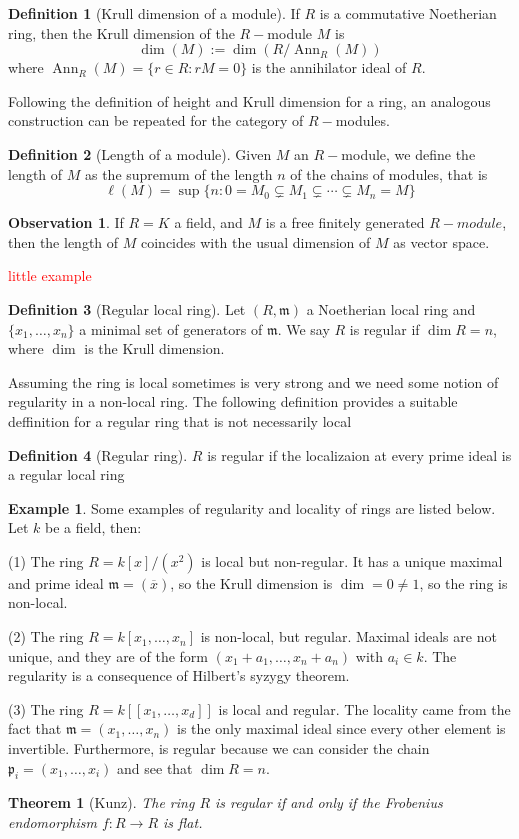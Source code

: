 \documentclass[leqno]{article}
\newtheorem{theorem}{Theorem}[section]
\theoremstyle{definition}
\newtheorem{definition}{Definition}[section]
\newtheorem{observation}{Observation}[section]
\newtheorem{example}{Example}[section]
\DeclareMathOperator{\Ann}{Ann}
\newcommand{\com}[1]{\textcolor{red}{#1}}
\begin{document}
\begin{definition}[Krull dimension of a module] If  $R$ is a commutative Noetherian ring, then the Krull dimension of the  $R-$module  $M$ is
   \[
\dim(M) := \dim (R / \Ann _R(M))
  \] 
  where $\Ann_R(M) = \{r \in R : rM = 0\}$ is the annihilator ideal of $R$.
\end{definition}

Following the definition of height and Krull dimension for a ring, an analogous construction can be repeated for the category of $R-$modules.

\begin{definition}[Length of a module] Given $M$ an $R-$module, we define the length of  $M$ as the supremum of the length $n$ of the chains of modules, that is
  \[
	\ell(M)= \sup \{n: 0 = M_0\subsetneq M_1 \subsetneq \cdots \subsetneq M_n = M\}
  \] 

\end{definition}

\begin{observation} If $R = K$ a field, and $M$ is a free finitely generated $R-module$, then the length of  $M$ coincides with the usual dimension of $M$ as vector space.
\end{observation}

\com{little example}

\begin{definition}[Regular local ring] Let $(R, \mathfrak{m})$ a Noetherian local ring and $\{x_1, \ldots, x_n\}$ a minimal set of generators of $\mathfrak{m}$. We say $R$ is regular if $\dim R=n$, where  $\dim$ is the Krull dimension.
\end{definition}

Assuming the ring is local sometimes is very strong and we need some notion of regularity in a non-local ring. The following definition provides a suitable deffinition for a regular ring that is not necessarily local
\begin{definition}[Regular ring] $R$ is regular if the localizaion at every prime ideal is a regular local ring
\end{definition}

\begin{example} Some examples of regularity and locality of rings are listed below. Let $k$ be a field, then:

  (1) The ring $R = k[x] / (x^2)$ is local but non-regular. It has a unique maximal and prime ideal  $\mathfrak{m}=(\overline{x})$, so the Krull dimension is $\dim = 0\neq 1$, so the ring is non-local.

  (2) The ring $R = k[x_1, \ldots, x_n]$ is non-local, but regular. Maximal ideals are not unique, and they are of the form $(x_1+a_1, \ldots, x_n+a_n)$ with  $a_i\in k$. The regularity is a consequence of Hilbert's syzygy theorem.

  (3) The ring $R = k[[x_1, \ldots, x_d]]$ is local and regular. The locality came from the fact that $\mathfrak{m} = (x_1, \ldots, x_n)$ is the only maximal ideal since every other element is invertible. Furthermore, is regular because we can consider the chain $\mathfrak{p}_i = (x_1, \ldots, x_i)$ and see that $\dim R = n$.
\end{example}

\begin{theorem}[Kunz] The ring  $R$ is regular if and only if the Frobenius endomorphism $f:R\to R$ is flat.
\end{theorem}
\end{document}
